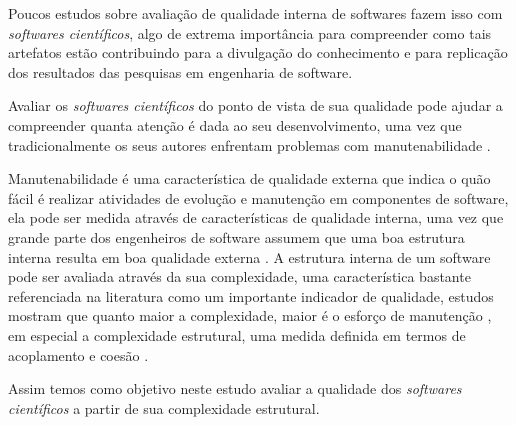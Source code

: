 
Poucos estudos sobre avaliação de qualidade interna de softwares fazem isso com
{\it softwares científicos}, algo de extrema importância para compreender como
tais artefatos estão contribuindo para a divulgação do conhecimento e para
replicação dos resultados das pesquisas em engenharia de software.

Avaliar os {\it softwares científicos} do ponto de vista de sua qualidade pode
ajudar a compreender quanta atenção é dada ao seu desenvolvimento, uma vez que
tradicionalmente os seus autores enfrentam problemas com manutenabilidade
\cite{Prlic2012}.

Manutenabilidade é uma característica de qualidade externa que indica o quão
fácil é realizar atividades de evolução e manutenção em componentes de
software, ela pode ser medida através de características de qualidade interna,
uma vez que grande parte dos engenheiros de software assumem que uma boa
estrutura interna resulta em boa qualidade externa \cite{Fenton2014}. A
estrutura interna de um software pode ser avaliada através da sua complexidade,
uma característica bastante referenciada na literatura como um importante
indicador de qualidade, estudos mostram que quanto maior a complexidade, maior
é o esforço de manutenção \cite{hashim1996software, Darcy2005}, em especial a
complexidade estrutural, uma medida definida em termos de acoplamento e coesão
\cite{Terceiro2012}.

Assim temos como objetivo neste estudo avaliar a qualidade dos {\it softwares
científicos} a partir de sua complexidade estrutural.


